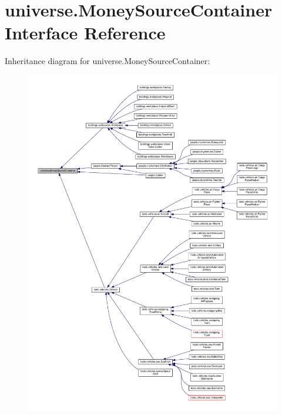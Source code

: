 \hypertarget{interfaceuniverse_1_1_money_source_container}{}\section{universe.\+Money\+Source\+Container Interface Reference}
\label{interfaceuniverse_1_1_money_source_container}


Inheritance diagram for universe.\+Money\+Source\+Container\+:\nopagebreak
\begin{figure}[H]
\begin{center}
\leavevmode
\includegraphics[width=350pt]{interfaceuniverse_1_1_money_source_container__inherit__graph}
\end{center}
\end{figure}

